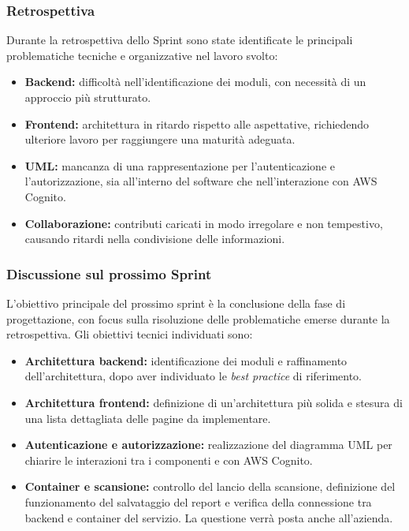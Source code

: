 \documentclass[a4paper, 11pt]{article}
\begin{document}
\subsubsection{Retrospettiva}
Durante la retrospettiva dello Sprint sono state identificate le principali problematiche tecniche e organizzative nel lavoro svolto:
\begin{itemize}
    \item \textbf{Backend:} difficoltà nell’identificazione dei moduli, con necessità di un approccio più strutturato.
    \item \textbf{Frontend:} architettura in ritardo rispetto alle aspettative, richiedendo ulteriore lavoro per raggiungere una maturità adeguata.
    \item \textbf{UML:} mancanza di una rappresentazione per l’autenticazione e l’autorizzazione, sia all’interno del software che nell’interazione con AWS Cognito.
    \item \textbf{Collaborazione:} contributi caricati in modo irregolare e non tempestivo, causando ritardi nella condivisione delle informazioni.
\end{itemize}

\subsubsection{Discussione sul prossimo Sprint}
L’obiettivo principale del prossimo sprint è la conclusione della fase di progettazione, con focus sulla risoluzione delle problematiche emerse durante la retrospettiva. Gli obiettivi tecnici individuati sono:

\begin{itemize}
    \item \textbf{Architettura backend:} identificazione dei moduli e raffinamento dell’architettura, dopo aver individuato le \textit{best practice} di riferimento.
    \item \textbf{Architettura frontend:} definizione di un’architettura più solida e stesura di una lista dettagliata delle pagine da implementare.
    \item \textbf{Autenticazione e autorizzazione:} realizzazione del diagramma UML per chiarire le interazioni tra i componenti e con AWS Cognito.
    \item \textbf{Container e scansione:} controllo del lancio della scansione, definizione del funzionamento del salvataggio del report e verifica della connessione tra backend e container del servizio. La questione verrà posta anche all’azienda.
\end{itemize}
\end{document}
